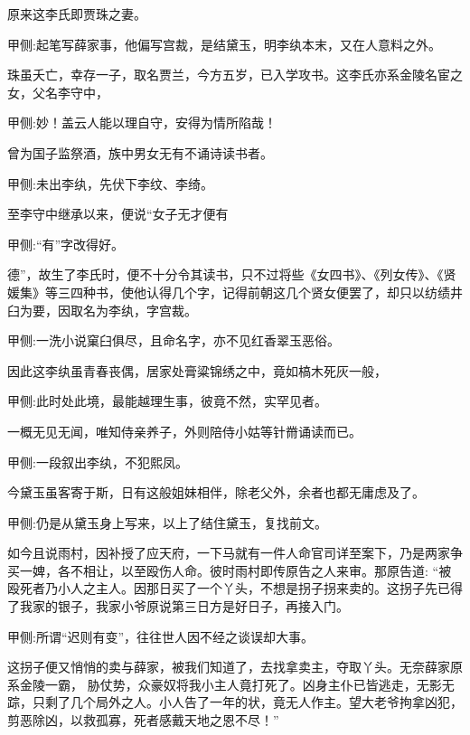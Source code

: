 \begin{parag}
    原来这李氏即贾珠之妻。\begin{note}甲侧:起笔写薛家事，他偏写宫裁，是结黛玉，明李纨本末，又在人意料之外。\end{note}珠虽夭亡，幸存一子，取名贾兰，今方五岁，已入学攻书。这李氏亦系金陵名宦之女，父名李守中，\begin{note}甲侧:妙！盖云人能以理自守，安得为情所陷哉！\end{note}曾为国子监祭酒，族中男女无有不诵诗读书者。\begin{note}甲侧:未出李纨，先伏下李纹、李绮。\end{note}至李守中继承以来，便说“女子无才便有\begin{note}甲侧:“有”字改得好。\end{note}德”，故生了李氏时，便不十分令其读书，只不过将些《女四书》、《列女传》、《贤媛集》等三四种书，使他认得几个字，记得前朝这几个贤女便罢了，却只以纺绩井臼为要，因取名为李纨，字宫裁。\begin{note}甲侧:一洗小说窠臼俱尽，且命名字，亦不见红香翠玉恶俗。\end{note}因此这李纨虽青春丧偶，居家处膏粱锦绣之中，竟如槁木死灰一般，\begin{note}甲侧:此时处此境，最能越理生事，彼竟不然，实罕见者。\end{note}一概无见无闻，唯知侍亲养子，外则陪侍小姑等针黹诵读而已。\begin{note}甲侧:一段叙出李纨，不犯熙凤。\end{note}今黛玉虽客寄于斯，日有这般姐妹相伴，除老父外，余者也都无庸虑及了。\begin{note}甲侧:仍是从黛玉身上写来，以上了结住黛玉，复找前文。\end{note}
\end{parag}


\begin{parag}
    如今且说雨村，因补授了应天府，一下马就有一件人命官司详至案下，乃是两家争买一婢，各不相让，以至殴伤人命。彼时雨村即传原告之人来审。那原告道: “被殴死者乃小人之主人。因那日买了一个丫头，不想是拐子拐来卖的。这拐子先已得了我家的银子，我家小爷原说第三日方是好日子，再接入门。\begin{note}甲侧:所谓“迟则有变”，往往世人因不经之谈误却大事。\end{note}这拐子便又悄悄的卖与薛家，被我们知道了，去找拿卖主，夺取丫头。无奈薛家原系金陵一霸， 胁仗势，众豪奴将我小主人竟打死了。凶身主仆已皆逃走，无影无踪，只剩了几个局外之人。小人告了一年的状，竟无人作主。望大老爷拘拿凶犯，剪恶除凶，以救孤寡，死者感戴天地之恩不尽！”
\end{parag}


